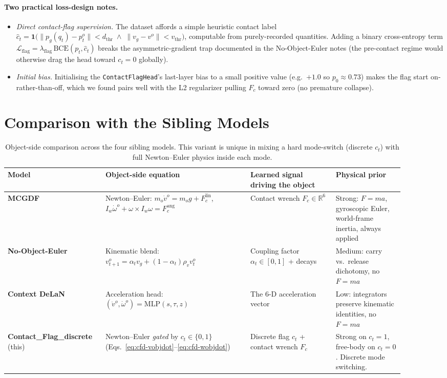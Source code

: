 \documentclass[11pt]{article}
\begin{document}
\paragraph{Two practical loss-design notes.}
\begin{itemize}
  \item \emph{Direct contact-flag supervision.}  The dataset
    affords a simple heuristic contact label
    $\hat c_t = \mathbf{1}\bigl(\|p_g(q_t) - p^o_t\| < d_{\mathrm{thr}}
    \;\wedge\; \|v_g - v^o\| < v_{\mathrm{thr}}\bigr)$, computable from
    purely-recorded quantities.  Adding a binary cross-entropy term
    \(
      \mathcal{L}_{\mathrm{flag}}
      = \lambda_{\mathrm{flag}} \, \mathrm{BCE}(p_t, \hat c_t)
    \)
    breaks the asymmetric-gradient trap documented in the No-Object-Euler
    notes (the pre-contact regime would otherwise drag the head
    toward $c_t = 0$ globally).
  \item \emph{Initial bias.}  Initialising the
    \texttt{ContactFlagHead}'s last-layer bias to a small positive
    value (e.g.\ $+1.0$ so $p_0 \approx 0.73$) makes the flag start
    on-rather-than-off, which we found pairs well with the L2
    regularizer pulling $F_c$ toward zero (no premature collapse).
\end{itemize}

\section{Comparison with the Sibling Models}

\begin{table}[h]
\centering
\small
\begin{tabular}{p{0.20\linewidth} p{0.34\linewidth} p{0.20\linewidth} p{0.16\linewidth}}
\toprule
Model & Object-side equation & Learned signal driving the object & Physical prior \\
\midrule
\textbf{MCGDF} & Newton--Euler:
\(m_o \dot v^o = m_o g + F_c^{\mathrm{lin}}\),
\(I_w \dot\omega^o + \omega \!\times\! I_w \omega = F_c^{\mathrm{ang}}\)
& Contact wrench $F_c \in \mathbb{R}^6$
& Strong: $F=ma$, gyroscopic Euler, world-frame inertia, always applied \\
\textbf{No-Object-Euler} & Kinematic blend:
\(v^o_{t+1} = \alpha_t v_g + (1-\alpha_t)\rho_v v^o_t\)
& Coupling factor $\alpha_t \in [0,1]$ + decays
& Medium: carry vs.\ release dichotomy, no $F=ma$ \\
\textbf{Context DeLaN} & Acceleration head:
\((\dot v^o, \dot\omega^o) = \mathrm{MLP}(s,\tau,z)\)
& The 6-D acceleration vector
& Low: integrators preserve kinematic identities, no $F=ma$ \\
\textbf{Contact\_Flag\_discrete} (this) & Newton--Euler \emph{gated} by $c_t \in \{0,1\}$
(Eqs.~\eqref{eq:cfd-vobjdot}--\eqref{eq:cfd-wobjdot})
& Discrete flag $c_t$ + contact wrench $F_c$
& Strong on $c_t = 1$, free-body on $c_t = 0$.
  Discrete mode switching. \\
\bottomrule
\end{tabular}
\caption{Object-side comparison across the four sibling models.  This
variant is unique in mixing a hard mode-switch (discrete $c_t$) with
full Newton--Euler physics inside each mode.}
\label{tab:cfd-vs-others}
\end{table}
\end{document}
